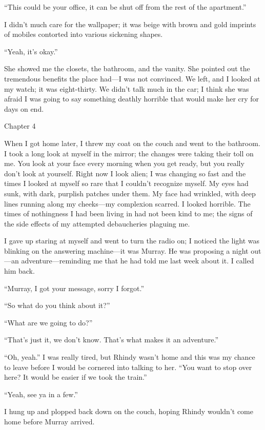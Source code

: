 ``This could be your office, it can be shut off from the rest of the
apartment.''

I didn't much care for the wallpaper; it was beige with brown and gold
imprints of mobiles contorted into various sickening shapes.

``Yeah, it's okay.''

She showed me the closets, the bathroom, and the vanity. She pointed out
the tremendous benefits the place had---I was not convinced. We left,
and I looked at my watch; it was eight-thirty. We didn't talk much in
the car; I think she was afraid I was going to say something deathly
horrible that would make her cry for days on end.

Chapter 4

When I got home later, I threw my coat on the couch and went to the
bathroom. I took a long look at myself in the mirror; the changes were
taking their toll on me. You look at your face every morning when you
get ready, but you really don't look at yourself. Right now I look
alien; I was changing so fast and the times I looked at myself so rare
that I couldn't recognize myself. My eyes had sunk, with dark, purplish
patches under them. My face had wrinkled, with deep lines running along
my cheeks---my complexion scarred. I looked horrible. The times of
nothingness I had been living in had not been kind to me; the signs of
the side effects of my attempted debaucheries plaguing me.

I gave up staring at myself and went to turn the radio on; I noticed the
light was blinking on the answering machine---it was Murray. He was
proposing a night out---an adventure---reminding me that he had told me
last week about it. I called him back.

``Murray, I got your message, sorry I forgot.''

``So what do you think about it?''

``What are we going to do?''

``That's just it, we don't know. That's what makes it an adventure.''

``Oh, yeah.'' I was really tired, but Rhindy wasn't home and this was my
chance to leave before I would be cornered into talking to her. ``You
want to stop over here? It would be easier if we took the train.''

``Yeah, see ya in a few.''

I hung up and plopped back down on the couch, hoping Rhindy wouldn't
come home before Murray arrived.

